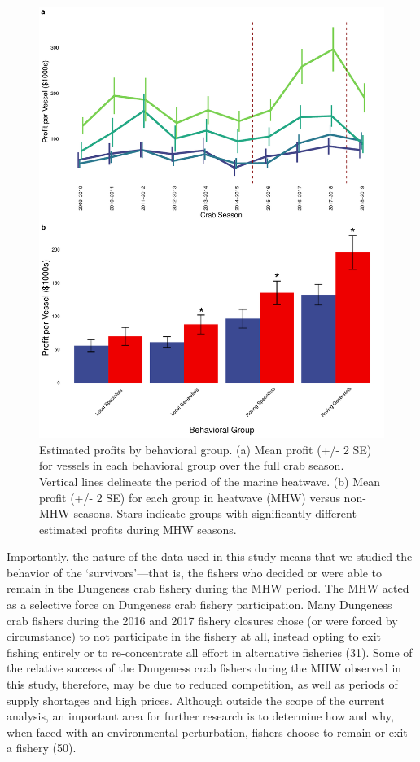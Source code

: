 \documentclass[9pt,twocolumn,twoside,lineno]{pnas-new}
\begin{document}
\begin{figure}%
\includegraphics[width=\linewidth]{fig_profits.pdf}
\caption{Estimated profits by behavioral group. (a) Mean profit (+/- 2 SE) for vessels in each behavioral group over the full crab season. Vertical lines delineate the period of the marine heatwave. (b) Mean profit (+/- 2 SE) for each group in heatwave (MHW) versus non-MHW seasons. Stars indicate groups with significantly different estimated profits during MHW seasons.}
\label{fig:profits}
\end{figure}

Importantly, the nature of the data used in this study means that we
studied the behavior of the `survivors'---that is, the fishers who
decided or were able to remain in the Dungeness crab fishery during the
MHW period. The MHW acted as a selective force on Dungeness crab fishery
participation. Many Dungeness crab fishers during the 2016 and 2017
fishery closures chose (or were forced by circumstance) to not
participate in the fishery at all, instead opting to exit fishing
entirely or to re-concentrate all effort in alternative fisheries (31).
Some of the relative success of the Dungeness crab fishers during the
MHW observed in this study, therefore, may be due to reduced
competition, as well as periods of supply shortages and high prices.
Although outside the scope of the current analysis, an important area
for further research is to determine how and why, when faced with an
environmental perturbation, fishers choose to remain or exit a fishery
(50).
\end{document}
